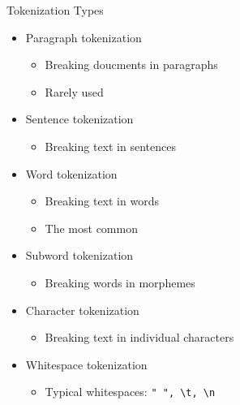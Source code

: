 
\begin{vbframe}{Tokenization Types}

\vfill

\begin{itemize}
	\item Paragraph tokenization 
		\begin{itemize}
			\item Breaking doucments in paragraphs 
			\item Rarely used
		\end{itemize}
		\item Sentence tokenization 
			\begin{itemize}
				\item Breaking text in sentences 
			\end{itemize}
		\item Word tokenization
			\begin{itemize}
				\item Breaking text in words
				\item The most common
			\end{itemize}
	\item Subword tokenization
		\begin{itemize}
			\item Breaking words in morphemes
		\end{itemize}
	\item Character tokenization
		\begin{itemize}
			\item Breaking text in individual characters
		\end{itemize}
	\item Whitespace tokenization
		\begin{itemize}
			\item Typical whitespaces: \verb|" ", \t, \n|
		\end{itemize}
\end{itemize}

\vfill

\end{vbframe}


